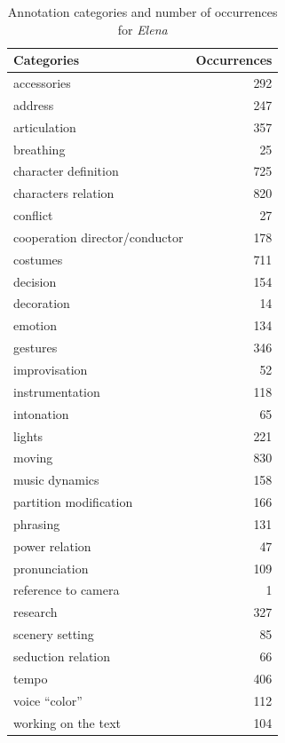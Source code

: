 \documentclass[conference]{IEEEtran}
\begin{document}
\begin{table}
\centering
\small
\begin{tabular}{|p{6cm}|r|}
\hline 
Categories & Occurrences \\ 
\hline 
accessories & 292 \\ 
\hline 
address & 247 \\ 
\hline 
articulation & 357 \\ 
\hline 
breathing & 25 \\ 
\hline 
character definition & 725 \\ 
\hline 
characters relation & 820 \\ 
\hline 
conflict & 27 \\ 
\hline 
cooperation director/conductor & 178 \\ 
\hline 
costumes & 711 \\ 
\hline 
decision & 154 \\ 
\hline 
decoration & 14 \\ 
\hline 
emotion & 134 \\ 
\hline 
gestures & 346 \\ 
\hline 
improvisation & 52 \\ 
\hline 
instrumentation & 118 \\ 
\hline 
intonation & 65 \\ 
\hline 
lights & 221 \\ 
\hline 
moving & 830 \\ 
\hline 
music dynamics & 158 \\ 
\hline 
partition modification & 166 \\ 
\hline 
phrasing & 131 \\ 
\hline 
power relation & 47 \\ 
\hline 
pronunciation & 109 \\ 
\hline 
reference to camera & 1 \\ 
\hline 
research & 327 \\ 
\hline 
scenery setting & 85 \\ 
\hline 
seduction relation & 66 \\ 
\hline 
tempo & 406 \\ 
\hline 
voice ``color'' & 112 \\ 
\hline 
working on the text & 104 \\ 
\hline 
\end{tabular} 
\label{table:categories2}
\caption{Annotation categories and number of occurrences for \emph{Elena}}
\end{table}  
 
\end{document}
